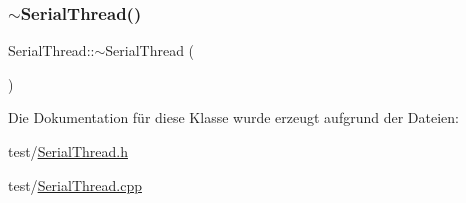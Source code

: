 \hypertarget{class_serial_thread_a14eabc004344a056196fa093189d9406}{}\label{class_serial_thread_a14eabc004344a056196fa093189d9406} 
\subsubsection{\texorpdfstring{$\sim$\+Serial\+Thread()}{~SerialThread()}}
{\footnotesize\ttfamily Serial\+Thread\+::$\sim$\+Serial\+Thread (\begin{DoxyParamCaption}{ }\end{DoxyParamCaption})\hspace{0.3cm}{\ttfamily [virtual]}}



Die Dokumentation für diese Klasse wurde erzeugt aufgrund der Dateien\+:\begin{DoxyCompactItemize}
\item 
test/\hyperlink{_serial_thread_8h}{Serial\+Thread.\+h}\item 
test/\hyperlink{_serial_thread_8cpp}{Serial\+Thread.\+cpp}\end{DoxyCompactItemize}

